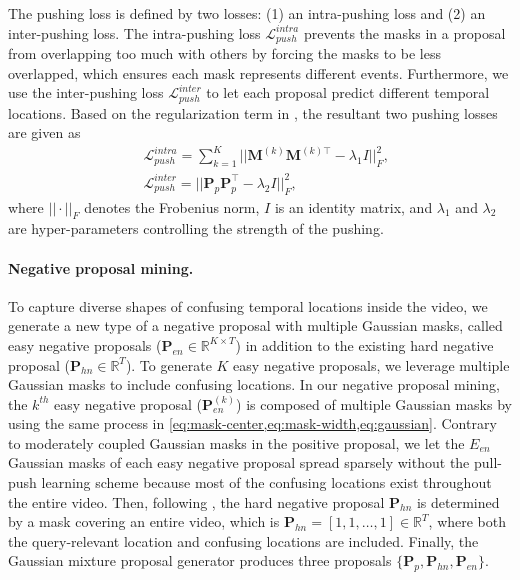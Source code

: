 The pushing loss is defined by two losses: (1) an intra-pushing loss and (2) an inter-pushing loss.
The intra-pushing loss $\mathcal{L}^{intra}_{push}$ prevents the masks in a proposal from overlapping too much with others by forcing the masks to be less overlapped, which ensures each mask represents different events.
Furthermore, we use the inter-pushing loss $\mathcal{L}^{inter}_{push}$ to let each proposal predict different temporal locations. Based on the regularization term in \cite{lin2017structured}, the resultant two pushing losses are given as
\begin{align}
  &\mathcal{L}^{intra}_{push} = \sum_{k=1}^K || \mathbf{M}^{(k)} \mathbf{M}^{(k)\top} - \lambda_1 I||^2_{F} \text{,} 
  \label{eq:intra-pushing-loss} \\
  &\mathcal{L}^{inter}_{push} = || \mathbf{P}_{p} \mathbf{P}_{p}^\top - \lambda_2 I||^2_{F} \text{,}
  \label{eq:inter-pushing-loss}
\end{align}
where $||\cdot||_F$ denotes the Frobenius norm, $I$ is an identity matrix, and $\lambda_1$ and $\lambda_2$ are hyper-parameters controlling the strength of the pushing.

\paragraph{Negative proposal mining.}
To capture diverse shapes of confusing temporal locations inside the video, we generate a new type of a negative proposal with multiple Gaussian masks, called easy negative proposals
($\mathbf{P}_{en} \in \mathbb{R}^{K\times T}$) in addition to the existing hard negative proposal
($\mathbf{P}_{hn} \in \mathbb{R}^{T}$).
To generate $K$ easy negative proposals, we leverage multiple Gaussian masks to include confusing locations.
In our negative proposal mining, the $k^{th}$ easy negative proposal ($\mathbf{P}^{(k)}_{en}$) is composed of multiple Gaussian masks by using the same process in \cref{eq:mask-center,eq:mask-width,eq:gaussian}.
Contrary to moderately coupled Gaussian masks in the positive proposal, we let the $E_{en}$ Gaussian masks of each easy negative proposal spread sparsely without the pull-push learning scheme because most of the confusing locations exist throughout the entire video.
Then, following \cite{zheng2022cnm,zheng2022cpl}, the hard negative proposal $\mathbf{P}_{hn}$ is determined by a mask covering an entire video, which is  $\mathbf{P}_{hn} = [1, 1, \dots, 1] \in \mathbb{R}^{T}$, where both the query-relevant location and confusing locations are included.
Finally, the Gaussian mixture proposal generator produces three proposals $\{\mathbf{P}_{p}, \mathbf{P}_{hn}, \mathbf{P}_{en}\}$.

